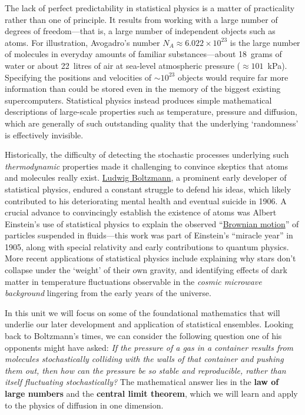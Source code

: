 The lack of perfect predictability in statistical physics is a matter of practicality rather than one of principle.
It results from working with a large number of degrees of freedom---that is, a large number of independent objects such as atoms.
For illustration, Avogadro's number $N_A \approx 6.022\times 10^{23}$ is the large number of molecules in everyday amounts of familiar substances---about 18~grams of water or about 22~litres of air at sea-level atmospheric pressure ($\approx$$101$~kPa). %
Specifying the positions and velocities of $\sim$$10^{23}$ objects would require far more information than could be stored even in the memory of the biggest existing supercomputers.
Statistical physics instead produces simple mathematical descriptions of large-scale properties such as temperature, pressure and diffusion, which are generally of such outstanding quality that the underlying `randomness' is effectively invisible.

Historically, the difficulty of detecting the stochastic processes underlying such \textit{thermodynamic} properties made it challenging to convince skeptics that atoms and molecules really exist.
\href{https://en.wikipedia.org/wiki/Ludwig_Boltzmann}{Ludwig Boltzmann}, a prominent early developer of statistical physics, endured a constant struggle to defend his ideas, which likely contributed to his deteriorating mental health and eventual suicide in 1906.
A crucial advance to convincingly establish the existence of atoms was Albert Einstein's use of statistical physics to explain the observed ``\href{https://en.wikipedia.org/wiki/Brownian_motion}{Brownian motion}'' of particles suspended in fluids---this work was part of Einstein's ``miracle year'' in 1905, along with special relativity and early contributions to quantum physics.
More recent applications of statistical physics include explaining why stars don't collapse under the `weight' of their own gravity, and identifying effects of dark matter in temperature fluctuations observable in the \textit{cosmic microwave background} lingering from the early years of the universe.

In this unit we will focus on some of the foundational mathematics that will underlie our later development and application of statistical ensembles.
Looking back to Boltzmann's times, we can consider the following question one of his opponents might have asked:
\textit{If the pressure of a gas in a container results from molecules stochastically colliding with the walls of that container and pushing them out, then how can the pressure be so stable and reproducible, rather than itself fluctuating stochastically?}
The mathematical answer lies in the \textbf{law of large numbers} and the \textbf{central limit theorem}, which we will learn and apply to the physics of diffusion in one dimension.



